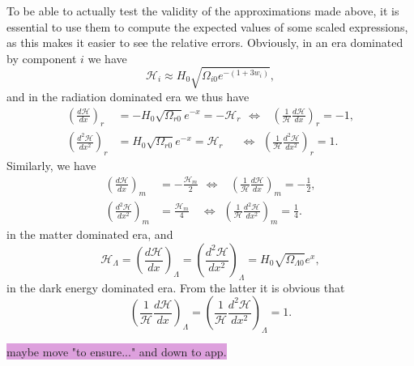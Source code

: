 \documentclass{aa}
\numberwithin{equation}{section}
\numberwithin{table}{section}
\numberwithin{figure}{section}
\begin{document}
To be able to actually test the validity of the approximations made above, it is essential to use them to compute the expected values of some scaled expressions, as this makes it easier to see the relative errors. Obviously, in an era dominated by component $i$ we have
\begin{equation}
    \mathcal{H}_i \approx H_0\sqrt{\Omega_{i0}e^{-(1+3w_i)}},
\end{equation}
and in the radiation dominated era we thus have
\begin{align}
  \left(\frac{d\mathcal{H}}{dx}\right)_r &= -H_0\sqrt{\Omega_{r0}}e^{-x}=-\mathcal{H}_r 
  \hspace{5pt}\Leftrightarrow\hspace{9pt}\left(\frac{1}{\mathcal{H}}\frac{d\mathcal{H}}{dx}\right)_r=-1,
  \\
  \left(\frac{d^2\mathcal{H}}{dx^2}\right)_r &= H_0\sqrt{\Omega_{r0}}e^{-x}=\mathcal{H}_r
  \hspace{18pt}\Leftrightarrow\hspace{5pt}\left(\frac{1}{\mathcal{H}}\frac{d^2\mathcal{H}}{dx^2}\right)_r=1.
\end{align}
Similarly, we have
\begin{align}
  \left(\frac{d\mathcal{H}}{dx}\right)_m &= -\frac{\mathcal{H}_m}{2} 
  \hspace{5pt}\Leftrightarrow\hspace{10pt}\left(\frac{1}{\mathcal{H}}\frac{d\mathcal{H}}{dx}\right)_m=-\frac{1}{2},
  \\
  \left(\frac{d^2\mathcal{H}}{dx^2}\right)_m &= \frac{\mathcal{H}_m}{4}
  \hspace{12pt}\Leftrightarrow\hspace{5pt}\left(\frac{1}{\mathcal{H}}\frac{d^2\mathcal{H}}{dx^2}\right)_m=\frac{1}{4}.
\end{align}
in the matter dominated era, and
\begin{equation}
  \mathcal{H}_\Lambda = \left(\frac{d\mathcal{H}}{dx}\right)_\Lambda = \left(\frac{d^2\mathcal{H}}{dx^2}\right)_\Lambda = H_0\sqrt{\Omega_{\Lambda0}}e^{x},
\end{equation}
in the dark energy dominated era. From the latter it is obvious that
\begin{equation}
  \left(\frac{1}{\mathcal{H}}\frac{d\mathcal{H}}{dx}\right)_\Lambda = \left(\frac{1}{\mathcal{H}}\frac{d^2\mathcal{H}}{dx^2}\right)_\Lambda = 1.
\end{equation} 

\colorbox{Plum}{maybe move "to ensure..." and down to app.}
\end{document}
